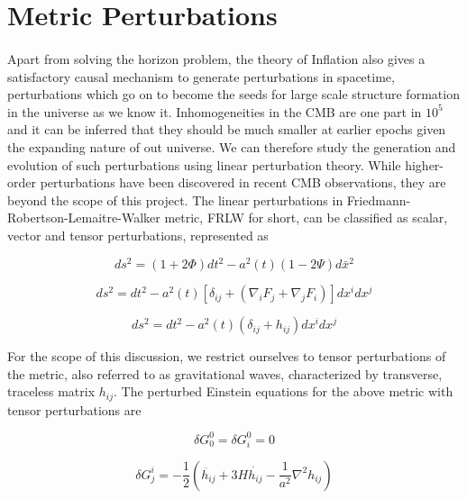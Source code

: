 \documentclass[12pt,a4paper,oneside]{book}
\begin{document}
\section{Metric Perturbations}

\paragraph*{} Apart from solving the horizon problem, the theory of Inflation also gives a satisfactory causal mechanism to generate perturbations in spacetime, perturbations which go on to become the seeds for large scale structure formation in the universe as we know it. Inhomogeneities in the CMB are one part in $10^5$ and it can be inferred that they should be much smaller at earlier epochs given the expanding nature of out universe. We can therefore study the generation and evolution of such perturbations using linear perturbation theory. While higher-order perturbations have been discovered in recent CMB observations, they are beyond the scope of this project. The linear perturbations in Friedmann-Robertson-Lemaitre-Walker metric, FRLW for short, can be classified as scalar, vector and tensor perturbations, represented as

\begin{equation}
ds^2 = (1+2\Phi)dt^2 - a^2(t)(1-2\Psi)d\bar{x}^2
\end{equation}

\begin{equation}
ds^2 = dt^2 - a^2(t)[\delta_{ij} + (\nabla_iF_j +\nabla_jF_i)]dx^idx^j
\end{equation}

\begin{equation}
ds^2 = dt^2 - a^2(t)(\delta_{ij} + h_{ij})dx^idx^j
\end{equation}

For the scope of  this discussion, we restrict ourselves to tensor perturbations of the metric, also referred to as gravitational waves, characterized by transverse, traceless matrix $h_{ij}$. The perturbed Einstein equations for the above metric with tensor perturbations are

\begin{equation}
\delta G^0_0 = \delta G^0_i = 0
\end{equation}

\begin{equation}
\delta G^i_j = -\frac{1}{2}(\ddot{h_{ij}} + 3H\dot{h_{ij}} - \frac{1}{a^2}\nabla ^2h_{ij})
\end{equation}
\end{document}
